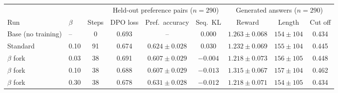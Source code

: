 \begin{adjustbox}{max width=\linewidth}
\begin{tabular}{llccccccc}
\toprule
 & & & \multicolumn{3}{c}{Held-out preference pairs ($n = 290$)} & \multicolumn{3}{c}{Generated answers ($n = 290$)} \\
\cmidrule(lr){4-6} \cmidrule(lr){7-9}
Run & $\beta$ & Steps & DPO loss & Pref.\ accuracy & Seq.\ KL & Reward & Length & Cut off \\
\midrule
Base (no training) & -- & 0 & 0.693 & -- & 0.000 & $1.263 \pm 0.068$ & $154 \pm 104$ & 0.434 \\
Standard & 0.10 & 91 & 0.674 & $0.624 \pm 0.028$ & 0.030 & $1.232 \pm 0.069$ & $155 \pm 104$ & 0.445 \\
\midrule
$\beta$ fork & 0.03 & 38 & 0.691 & $0.607 \pm 0.029$ & $-0.004$ & $1.218 \pm 0.073$ & $156 \pm 105$ & 0.448 \\
$\beta$ fork & 0.10 & 38 & 0.688 & $0.607 \pm 0.029$ & $-0.013$ & $1.315 \pm 0.067$ & $157 \pm 104$ & 0.462 \\
$\beta$ fork & 0.30 & 38 & 0.678 & $0.631 \pm 0.028$ & $-0.012$ & $1.218 \pm 0.071$ & $154 \pm 105$ & 0.434 \\
\bottomrule
\end{tabular}
\end{adjustbox}
